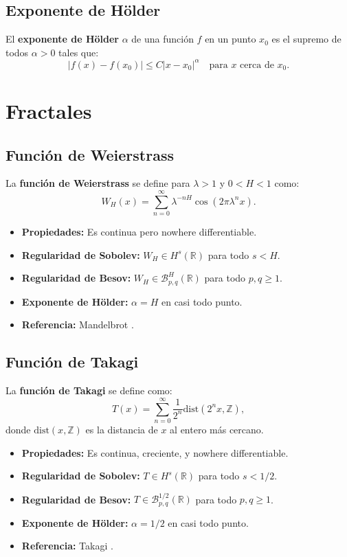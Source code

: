 \documentclass[12pt]{book}
\newcommand{\bes}{\mathcal{B}}
\newcommand{\R}{\mathbb{R}}
\newcommand{\Z}{\mathbb{Z}}
\newcommand{\dist}{\text{dist}}
\theoremstyle{definition}
\theoremstyle{plain}
\theoremstyle{remark}
\begin{document}
\subsection{Exponente de Hölder}
El \textbf{exponente de Hölder} \(\alpha\) de una función \(f\) en un punto \(x_0\) es el supremo de todos \(\alpha > 0\) tales que:
\[
|f(x) - f(x_0)| \leq C |x - x_0|^\alpha \quad \text{para } x \text{ cerca de } x_0.
\]

\section{Fractales}

\subsection{Función de Weierstrass}
La \textbf{función de Weierstrass} se define para \(\lambda > 1\) y \(0 < H < 1\) como:
\[
W_H(x) = \sum_{n=0}^{\infty} \lambda^{-nH} \cos(2\pi \lambda^n x).
\]
\begin{itemize}
    \item \textbf{Propiedades:} Es continua pero nowhere differentiable.
    \item \textbf{Regularidad de Sobolev:} \(W_H \in H^s(\R)\) para todo \(s < H\).
    \item \textbf{Regularidad de Besov:} \(W_H \in \bes_{p,q}^H(\R)\) para todo \(p, q \geq 1\).
    \item \textbf{Exponente de Hölder:} \(\alpha = H\) en casi todo punto.
    \item \textbf{Referencia:} Mandelbrot \cite{mandelbrot1982fractal}.
\end{itemize}

\subsection{Función de Takagi} %
La \textbf{función de Takagi} se define como:
\[
T(x) = \sum_{n=0}^{\infty} \frac{1}{2^n} \dist(2^n x, \Z),
\]
donde \(\dist(x, \Z)\) es la distancia de \(x\) al entero más cercano.
\begin{itemize}
    \item \textbf{Propiedades:} Es continua, creciente, y nowhere differentiable.
    \item \textbf{Regularidad de Sobolev:} \(T \in H^s(\R)\) para todo \(s < 1/2\).
    \item \textbf{Regularidad de Besov:} \(T \in \bes_{p,q}^{1/2}(\R)\) para todo \(p, q \geq 1\).
    \item \textbf{Exponente de Hölder:} \(\alpha = 1/2\) en casi todo punto.
    \item \textbf{Referencia:} Takagi \cite{takagi1903}.
\end{itemize}
\end{document}
